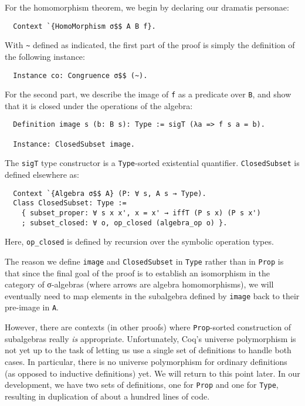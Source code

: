 \documentclass[a4paper,10pt,runningheads]{llncs}
\begin{document}
For the homomorphism theorem, we begin by declaring our dramatis personae:
\begin{lstlisting}
  Context `{HomoMorphism σ$$ A B f}.
\end{lstlisting}
With \lstinline|~| defined as indicated, the first part of the proof is simply the definition of the following instance:
\begin{lstlisting}
  Instance co: Congruence σ$$ (~).
\end{lstlisting}

For the second part, we describe the image of \lstinline|f| as a predicate over \lstinline|B|, and show that it is closed under the operations of the algebra: 
\begin{lstlisting}
  Definition image s (b: B s): Type := sigT (λa => f s a = b).

  Instance: ClosedSubset image.
\end{lstlisting}
The \lstinline|sigT| type constructor is a \lstinline|Type|-sorted existential quantifier. \lstinline|ClosedSubset| is defined elsewhere as:
\begin{lstlisting}
  Context `{Algebra σ$$ A} (P: ∀ s, A s → Type).
  Class ClosedSubset: Type :=
    { subset_proper: ∀ s x x', x = x' → iffT (P s x) (P s x')
    ; subset_closed: ∀ o, op_closed (algebra_op o) }.
\end{lstlisting}
Here, \lstinline|op_closed| is defined by recursion over the symbolic operation types.

The reason we define \lstinline|image| and \lstinline|ClosedSubset| in \lstinline|Type| rather than in \lstinline|Prop| is that since the final goal of the proof is to establish an isomorphism in the category of σ-algebras (where arrows are algebra homomorphisms), we will eventually need to map elements in the subalgebra defined by \lstinline|image| back to their pre-image in \lstinline|A|.

However, there are contexts (in other proofs) where \lstinline|Prop|-sorted construction of subalgebras really \emph{is} appropriate. Unfortunately, Coq's universe polymorphism is not yet up to the task of letting us use a single set of definitions to handle both cases. In particular, there is no universe polymorphism for ordinary definitions (as opposed to inductive definitions) yet. We will return to this point later. In our development, we have two sets of definitions, one for \lstinline|Prop| and one for \lstinline|Type|, resulting in duplication of about a hundred lines of code.
\end{document}
